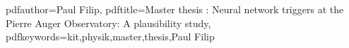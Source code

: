 \newcommand{\thesisentopic}{Neural network triggers at the Pierre Auger Observatory: A plausibility study}

\newcommand{\thesisinstitute}{Institute for Astro Particle Physics}

\newcommand{\thesisauthor}{Paul Filip}
\newcommand{\thesisreviewerone}{Prof. Dr. Ralph Engel}
\newcommand{\thesisreviewertwo}{Prof. Dr. TBD}

\newcommand{\thesistimestart}{TBD}
\newcommand{\thesistimeend}{TBD}
\newcommand{\thesistimehandin}{TBD}

\hypersetup
{
	pdfauthor={\thesisauthor},
	pdftitle={Master thesis : \thesisentopic},
	pdfkeywords={kit,physik,master,thesis,\thesisauthor}
}